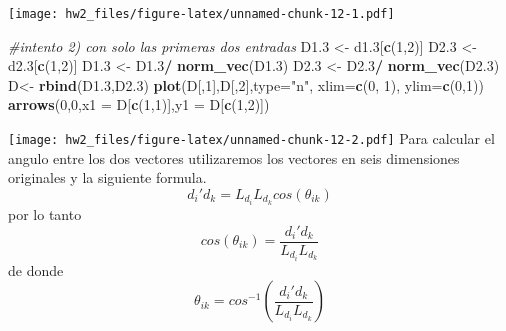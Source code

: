 \documentclass[]{article}
\newenvironment{Shaded}{\begin{snugshade}}{\end{snugshade}}
\newcommand{\CommentTok}[1]{\textcolor[rgb]{0.56,0.35,0.01}{\textit{#1}}}
\newcommand{\DataTypeTok}[1]{\textcolor[rgb]{0.13,0.29,0.53}{#1}}
\newcommand{\DecValTok}[1]{\textcolor[rgb]{0.00,0.00,0.81}{#1}}
\newcommand{\FloatTok}[1]{\textcolor[rgb]{0.00,0.00,0.81}{#1}}
\newcommand{\KeywordTok}[1]{\textcolor[rgb]{0.13,0.29,0.53}{\textbf{#1}}}
\newcommand{\NormalTok}[1]{#1}
\newcommand{\OperatorTok}[1]{\textcolor[rgb]{0.81,0.36,0.00}{\textbf{#1}}}
\newcommand{\StringTok}[1]{\textcolor[rgb]{0.31,0.60,0.02}{#1}}
\begin{document}
\texttt{[image: hw2\_files/figure-latex/unnamed-chunk-12-1.pdf]}

\begin{Shaded}
\begin{Highlighting}[]
\CommentTok{#intento 2) con solo las primeras dos entradas}
\NormalTok{D1}\FloatTok{.3}\NormalTok{ <-}\StringTok{ }\NormalTok{d1}\FloatTok{.3}\NormalTok{[}\KeywordTok{c}\NormalTok{(}\DecValTok{1}\NormalTok{,}\DecValTok{2}\NormalTok{)]}
\NormalTok{D2}\FloatTok{.3}\NormalTok{ <-}\StringTok{ }\NormalTok{d2}\FloatTok{.3}\NormalTok{[}\KeywordTok{c}\NormalTok{(}\DecValTok{1}\NormalTok{,}\DecValTok{2}\NormalTok{)]}
\NormalTok{D1}\FloatTok{.3}\NormalTok{ <-}\StringTok{ }\NormalTok{D1}\FloatTok{.3}\OperatorTok{/}\StringTok{ }\KeywordTok{norm_vec}\NormalTok{(D1}\FloatTok{.3}\NormalTok{)}
\NormalTok{D2}\FloatTok{.3}\NormalTok{ <-}\StringTok{ }\NormalTok{D2}\FloatTok{.3}\OperatorTok{/}\StringTok{ }\KeywordTok{norm_vec}\NormalTok{(D2}\FloatTok{.3}\NormalTok{)}
\NormalTok{D<-}\StringTok{ }\KeywordTok{rbind}\NormalTok{(D1}\FloatTok{.3}\NormalTok{,D2}\FloatTok{.3}\NormalTok{)}
\KeywordTok{plot}\NormalTok{(D[,}\DecValTok{1}\NormalTok{],D[,}\DecValTok{2}\NormalTok{],}\DataTypeTok{type=}\StringTok{"n"}\NormalTok{, }\DataTypeTok{xlim=}\KeywordTok{c}\NormalTok{(}\DecValTok{0}\NormalTok{, }\DecValTok{1}\NormalTok{), }\DataTypeTok{ylim=}\KeywordTok{c}\NormalTok{(}\DecValTok{0}\NormalTok{,}\DecValTok{1}\NormalTok{))}
\KeywordTok{arrows}\NormalTok{(}\DecValTok{0}\NormalTok{,}\DecValTok{0}\NormalTok{,}\DataTypeTok{x1 =}\NormalTok{ D[}\KeywordTok{c}\NormalTok{(}\DecValTok{1}\NormalTok{,}\DecValTok{1}\NormalTok{)],}\DataTypeTok{y1 =}\NormalTok{ D[}\KeywordTok{c}\NormalTok{(}\DecValTok{1}\NormalTok{,}\DecValTok{2}\NormalTok{)])}
\end{Highlighting}
\end{Shaded}

\texttt{[image: hw2\_files/figure-latex/unnamed-chunk-12-2.pdf]} Para
calcular el angulo entre los dos vectores utilizaremos los vectores en
seis dimensiones originales y la siguiente formula.
\[ d_i'd_k = L_{d_i}L_{d_k}cos(\theta_{ik})\] por lo tanto
\[cos(\theta_{ik}) = \frac{d_i'd_k }{L_{d_i}L_{d_k}}\] de donde
\[\theta_{ik} = cos^{-1}(\frac{d_i'd_k }{L_{d_i}L_{d_k}})\]

\begin{Shaded}
\end{Shaded}
\end{document}

